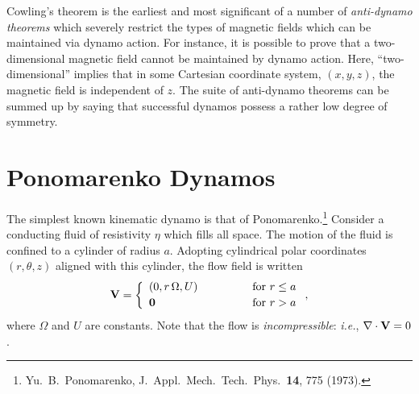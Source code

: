 Cowling's theorem is the earliest and most significant of a number of
{\em anti-dynamo theorems} which severely restrict the types of magnetic
fields which can be maintained via dynamo action. For instance, it is
possible to prove that a two-dimensional magnetic field cannot be maintained
by dynamo action. Here, ``two-dimensional'' implies that in some
Cartesian coordinate system, $(x,y,z)$, the magnetic field is independent of
$z$. The suite of anti-dynamo theorems can be summed up
by saying that successful dynamos possess a rather low degree of symmetry.

\section{Ponomarenko Dynamos}
The simplest known kinematic dynamo is that
of Ponomarenko.\footnote{Yu.~B.~Ponomarenko, J.~Appl.\ Mech.\
Tech.\ Phys.\ {\bf 14}, 775 (1973).} Consider a conducting fluid
of resistivity $\eta$ which fills all space. The motion of the fluid
is confined to a cylinder of radius $a$. Adopting cylindrical polar coordinates
$(r,\theta,z)$ aligned with this cylinder, the flow field is written
\begin{equation}
{\bf V} =\left\{
\begin{array}{lll}
(0,r\,{\Omega}, U)&\mbox{\hspace{1cm}}& \mbox{for $r\leq a$}\\[0.5ex]
{\bf 0} && \mbox{for $r>a$}
\end{array}
\right.,
\end{equation}
where ${\Omega}$ and $U$ are constants. Note that the flow is {\em 
incompressible}:
{\em i.e.}, $\nabla\cdot{\bf V} =0$. 

